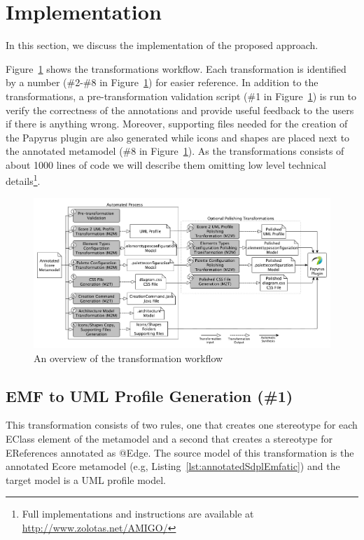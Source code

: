 \section{Implementation}
\label{sec:implementation}
In this section, we discuss the implementation of the proposed approach. 

Figure~\ref{fig:transformationWorkflow} shows the transformations workflow. Each transformation is identified by a number (\#2-\#8 in Figure~\ref{fig:transformationWorkflow}) for easier reference. 
In addition to the transformations, a pre-transformation validation script (\#1 in Figure~\ref{fig:transformationWorkflow}) is run to verify the correctness of the annotations and provide useful feedback to the users if there is anything wrong. Moreover, supporting files needed for the creation of the Papyrus plugin are also generated while icons and shapes are placed next to the annotated metamodel (\#8 in Figure~\ref{fig:transformationWorkflow}). 
As the transformations consists of about 1000 lines of code we will describe them omitting low level technical details\footnote{Full implementations and instructions are available at \url{http://www.zolotas.net/AMIGO/}}. 

\begin{figure}[t]
	\centering
	\includegraphics[width=1	\textwidth]{diagrams/transformationWorkflow.pdf}
	\caption[]{An overview of the transformation workflow}
	\label{fig:transformationWorkflow}
	\vspace*{-3mm}
\end{figure}


\subsection{EMF to UML Profile Generation (\#1)}
\label{sec:profileGeneration}
This transformation consists of two rules, one that creates one stereotype for each EClass element of the metamodel and a second that creates a stereotype for EReferences annotated as @Edge. 
The source model of this transformation is the annotated Ecore metamodel (e.g,  Listing~\ref{lst:annotatedSdplEmfatic}) and the target model is a UML profile model.

